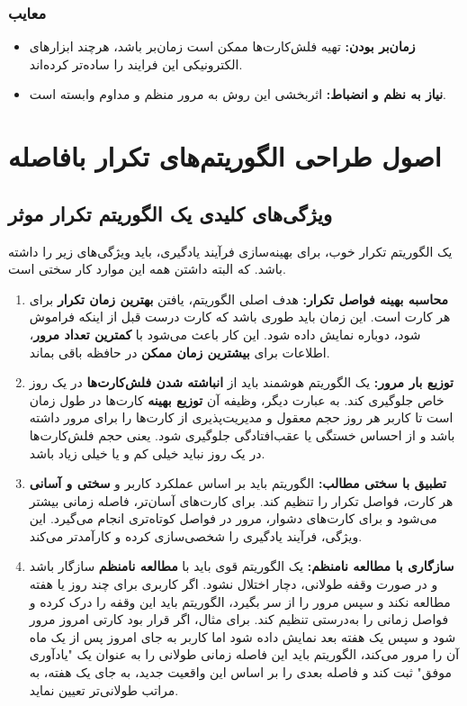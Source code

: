 \documentclass[12pt]{report}
\begin{document}
\subsection{معایب}
\begin{itemize}
    \item \textbf{زمان‌بر بودن:} تهیه فلش‌کارت‌ها ممکن است زمان‌بر باشد، هرچند ابزارهای الکترونیکی این فرایند را ساده‌تر کرده‌اند.
    \item \textbf{نیاز به نظم و انضباط:} اثربخشی این روش به مرور منظم و مداوم وابسته است.
\end{itemize}

\chapter{اصول طراحی الگوریتم‌های تکرار بافاصله}

\section{ویژگی‌های کلیدی یک الگوریتم تکرار موثر}
یک الگوریتم تکرار خوب، برای بهینه‌سازی فرآیند یادگیری، باید ویژگی‌های زیر را داشته باشد. که البته داشتن همه این موارد کار سختی است.

\begin{enumerate}
    \item \textbf{محاسبه بهینه فواصل تکرار:} هدف اصلی الگوریتم، یافتن \textbf{بهترین زمان تکرار} برای هر کارت است. این زمان باید طوری باشد که کارت درست قبل از اینکه فراموش شود، دوباره نمایش داده شود. این کار باعث می‌شود با \textbf{کمترین تعداد مرور}، اطلاعات برای \textbf{بیشترین زمان ممکن} در حافظه باقی بماند.

    \item \textbf{توزیع بار مرور:} یک الگوریتم هوشمند باید از \textbf{انباشته شدن فلش‌کارت‌ها} در یک روز خاص جلوگیری کند. به عبارت دیگر، وظیفه آن \textbf{توزیع بهینه} کارت‌ها در طول زمان است تا کاربر هر روز حجم معقول و مدیریت‌پذیری از کارت‌ها را برای مرور داشته باشد و از احساس خستگی یا عقب‌افتادگی جلوگیری شود. یعنی حجم فلش‌کارت‌ها در یک روز نباید خیلی کم و یا خیلی زیاد باشد.

    \item \textbf{تطبیق با سختی مطالب:} الگوریتم باید بر اساس عملکرد کاربر و \textbf{سختی و آسانی} هر کارت، فواصل تکرار را تنظیم کند. برای کارت‌های آسان‌تر، فاصله زمانی بیشتر می‌شود و برای کارت‌های دشوار، مرور در فواصل کوتاه‌تری انجام می‌گیرد. این ویژگی، فرآیند یادگیری را شخصی‌سازی کرده و کارآمدتر می‌کند.

    \item \textbf{سازگاری با مطالعه نامنظم:} یک الگوریتم قوی باید با \textbf{مطالعه نامنظم} سازگار باشد و در صورت وقفه طولانی، دچار اختلال نشود. اگر کاربری برای چند روز یا هفته مطالعه نکند و سپس مرور را از سر بگیرد، الگوریتم باید این وقفه را درک کرده و فواصل زمانی را به‌درستی تنظیم کند. برای مثال، اگر قرار بود کارتی امروز مرور شود و سپس یک هفته بعد نمایش داده شود اما کاربر به جای امروز پس از یک ماه آن را مرور می‌کند، الگوریتم باید این فاصله زمانی طولانی را به عنوان یک "یادآوری موفق" ثبت کند و فاصله بعدی را بر اساس این واقعیت جدید، به جای یک هفته، به مراتب طولانی‌تر تعیین نماید.
\end{enumerate}
\end{document}
